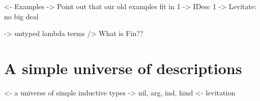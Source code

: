 \documentclass[preprint, authoryear]{sigplanconf}
\newenvironment{structure}{\footnotesize\verbatim}{\endverbatim}
\begin{document}
\begin{structure}
<- Examples
    -> Point out that our old examples fit in 1 -> IDesc 1
    -> Levitate: no big deal
\end{structure}


\begin{structure}
    -> untyped lambda terms
        /> What is Fin??
\end{structure}




\section{A simple universe of descriptions}

\begin{structure}
<- a universe of simple inductive types
    -> nil, arg, ind, hind
<- levitation
\end{structure}

\end{document}

